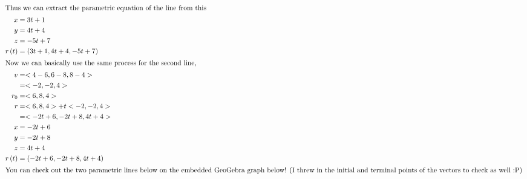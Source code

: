 \documentclass[12pt]{article}
\begin{document}
\begin{align*}
	\intertext{Thus we can extract the parametric equation of the line from this }
	x               & =3t+1                          \\
	y               & =4t+4                          \\
	z               & =-5t+7                         \\
	r\left(t\right) & =\left(3t+1,4t+4,-5t+7\right)  \\
	\intertext{Now we can basically use the same process for the second line,}
	v               & =<4-6,6-8,8-4>                 \\
	                & =<-2,-2,4>                     \\
	r_{0}           & =<6,8,4>                       \\
	r               & =<6,8,4>+t<-2,-2,4>            \\
	                & =<-2t+6,-2t+8,4t+4>            \\
	x               & =-2t+6                         \\
	y               & =-2t+8                         \\
	z               & =4t+4                          \\
	r\left(t\right) & =\left(-2t+6,-2t+8,4t+4\right) \\
	\intertext{You can check out the two parametric lines below on the embedded GeoGebra graph below! (I threw in the initial and terminal points of the vectors to check as well :P) }
\end{align*}
\end{document}
